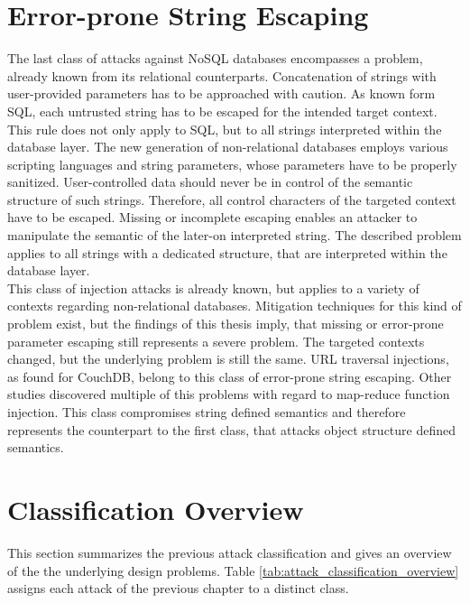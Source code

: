 \section{Error-prone String Escaping}
The last class of attacks against NoSQL databases encompasses a problem, already known from its relational counterparts. Concatenation of strings with user-provided parameters has to be approached with caution. As known form SQL, each untrusted string has to be escaped for the intended target context. This rule does not only apply to SQL, but to all strings interpreted within the database layer. The new generation of non-relational databases employs various scripting languages and string parameters, whose parameters have to be properly sanitized. User-controlled data should never be in control of the semantic structure of such strings. Therefore, all control characters of the targeted context have to be escaped. Missing or incomplete escaping enables an attacker to manipulate the semantic of the later-on interpreted string. The described problem applies to all strings with a dedicated structure, that are interpreted within the database layer. \\

This class of injection attacks is already known, but applies to a variety of contexts regarding non-relational databases. Mitigation techniques for this kind of problem exist, but the findings of this thesis imply, that missing or error-prone parameter escaping still represents a severe problem. The targeted contexts changed, but the underlying problem is still the same. URL traversal injections, as found for CouchDB, belong to this class of error-prone string escaping. Other studies discovered multiple of this problems with regard to map-reduce function injection. This class compromises string defined semantics and therefore represents the counterpart to the first class, that attacks object structure defined semantics.\\

\section{Classification Overview}
This section summarizes the previous attack classification and gives an overview of the the underlying design problems. Table \ref{tab:attack_classification_overview} assigns each attack of the previous chapter to a distinct class. \\

